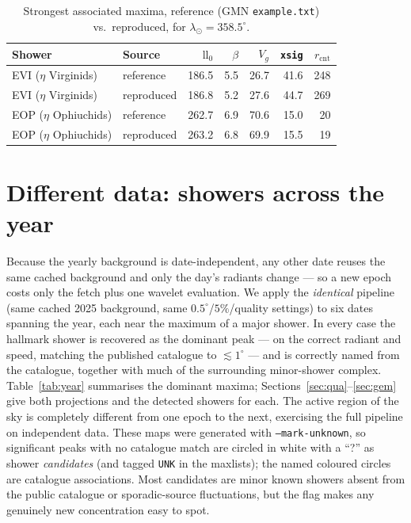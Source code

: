 \documentclass[11pt]{article}
\newcommand{\flag}[1]{\texttt{#1}}
\begin{document}
\begin{table}[H]
  \centering
  \caption{Strongest associated maxima, reference (GMN \texttt{example.txt}) vs.\
  reproduced, for $\lambda_\odot=358.5^\circ$.}
  \label{tab:same}
  \begin{tabular}{llrrrrr}
    \toprule
    Shower & Source & $\mathrm{ll}_0$ & $\beta$ & $V_g$ & \texttt{xsig} & $r_\mathrm{cnt}$\\
    \midrule
    EVI ($\eta$ Virginids)   & reference  & 186.5 & 5.5 & 26.7 & 41.6 & 248\\
    EVI ($\eta$ Virginids)   & reproduced & 186.8 & 5.2 & 27.6 & 44.7 & 269\\[2pt]
    EOP ($\eta$ Ophiuchids)  & reference  & 262.7 & 6.9 & 70.6 & 15.0 & 20\\
    EOP ($\eta$ Ophiuchids)  & reproduced & 263.2 & 6.8 & 69.9 & 15.5 & 19\\
    \bottomrule
  \end{tabular}
\end{table}

\section{Different data: showers across the year}
\label{sec:diff}

Because the yearly background is date-independent, any other date reuses the same
cached background and only the day's radiants change --- so a new epoch costs only
the fetch plus one wavelet evaluation. We apply the \emph{identical} pipeline
(same cached 2025 background, same $0.5^\circ$/$5\%$/quality settings) to six
dates spanning the year, each near the maximum of a major shower. In every case
the hallmark shower is recovered as the dominant peak --- on the correct radiant
and speed, matching the published catalogue to $\lesssim 1^\circ$ --- and is
correctly named from the catalogue, together with much of the surrounding
minor-shower complex. Table~\ref{tab:year} summarises the dominant maxima;
Sections~\ref{sec:qua}--\ref{sec:gem} give both projections and the detected
showers for each. The active region of the sky is completely different from one
epoch to the next, exercising the full pipeline on independent data. These maps
were generated with \flag{--mark-unknown}, so significant peaks with no catalogue
match are circled in white with a ``?'' as shower \emph{candidates} (and tagged
\texttt{UNK} in the maxlists); the named coloured circles are catalogue
associations. Most candidates are minor known showers absent from the public
catalogue or sporadic-source fluctuations, but the flag makes any genuinely new
concentration easy to spot.
\end{document}
